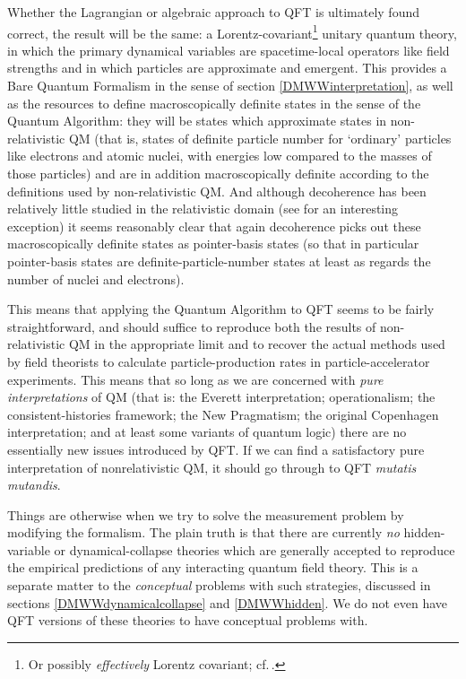 \documentclass[12pt]{article}
\begin{document}
Whether the Lagrangian or algebraic approach to QFT is ultimately found correct, the result will be the same: a Lorentz-covariant\footnote{Or possibly \emph{effectively} Lorentz covariant; cf.\,.} unitary quantum theory, in which the primary dynamical variables are spacetime-local operators like field strengths and in which particles are approximate and emergent. This provides a Bare Quantum Formalism in the sense of section \ref{DMWWinterpretation}, as well as the resources to define macroscopically definite states in the sense of the Quantum Algorithm: they will be states which approximate states in non-relativistic QM (that is, states of definite particle number for `ordinary' particles like electrons and atomic nuclei, with energies low compared to the masses of those particles) and are in addition macroscopically definite according to the definitions used by non-relativistic QM. And  although decoherence has been relatively little studied in the relativistic domain (see  for an interesting exception) it seems reasonably clear that again decoherence picks out these macroscopically definite states as pointer-basis states (so that in particular pointer-basis states are definite-particle-number states at least as regards the number of nuclei and electrons).

This means that applying the Quantum Algorithm to QFT seems to be fairly straightforward, and should suffice to reproduce both the results of non-relativistic QM in the appropriate limit and to recover the actual methods used by field theorists to calculate  particle-production rates in particle-accelerator experiments.  This means that so long as we are concerned with \emph{pure interpretations} of QM (that is: the Everett interpretation; operationalism; the consistent-histories framework; the New Pragmatism; the original Copenhagen interpretation; and at least some variants of quantum logic) there are no essentially new issues introduced by QFT. If we can find a satisfactory pure interpretation of nonrelativistic QM, it should go through to QFT \emph{mutatis mutandis}.

Things are otherwise when we try to solve the measurement problem by modifying the formalism. The plain truth is that there are currently \emph{no} hidden-variable or dynamical-collapse theories which are generally accepted to reproduce the empirical predictions of any interacting quantum field theory. This is a separate matter to the \emph{conceptual} problems with such strategies, discussed in sections \ref{DMWWdynamicalcollapse} and \ref{DMWWhidden}. We do not even have QFT versions of these theories to have conceptual problems with.
\end{document}
